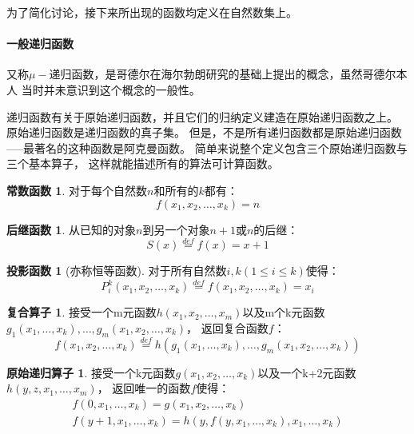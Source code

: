 \documentclass[12pt,a4paper,oneside]{ctexrep}
\theoremstyle{definition}
\newtheorem{con}[rf]{常数函数}
\newtheorem{suc}[rf]{后继函数}
\newtheorem{pro}[rf]{投影函数}
\newtheorem{com}[rf]{复合算子}
\newtheorem{pri}[rf]{原始递归算子}
\begin{document}
为了简化讨论，接下来所出现的函数均定义在自然数集上。

\paragraph{一般递归函数}

又称$\mu-$递归函数，是哥德尔在海尔勃朗研究的基础上提出的概念，虽然哥德尔本人
当时并未意识到这个概念的一般性。

递归函数有关于原始递归函数，并且它们的归纳定义建造在原始递归函数之上。
原始递归函数是递归函数的真子集。
但是，不是所有递归函数都是原始递归函数-----最著名的这种函数是阿克曼函数。
简单来说整个定义包含三个原始递归函数与三个基本算子，
这样就能描述所有的算法可计算函数。

\begin{con}
对于每个自然数$n$和所有的$k$都有：
\begin{equation}
f(x_1,x_2,\ldots,x_k)=n
\end{equation}
\end{con}

\begin{suc}
从已知的对象$n$到另一个对象$n+1$或$n$的后继：
\begin{equation}
S(x)\stackrel{def}{=}f(x)=x+1
\end{equation}
\end{suc}

\begin{pro}[亦称恒等函数]
对于所有自然数$i,k(1\leq i \leq k)$使得：
\begin{equation}
P^k_i(x_1,x_2,\ldots,x_k) \stackrel{def}{=}f(x_1,x_2,\ldots,x_k)=x_i
\end{equation}
\end{pro}

\begin{com}
接受一个m元函数$h(x_1,x_2,\ldots,x_m)$以及m个k元函数$g_1(x_1,\ldots,x_k),\ldots,g_m(x_1,x_2,\ldots,x_k)$，
返回复合函数$f$：
\begin{equation}
f(x_1,x_2,\ldots,x_k) \stackrel{def}{=}h(g_1(x_1,\ldots,x_k),\ldots,g_m(x_1,x_2,\ldots,x_k))
\end{equation}
\end{com}

\begin{pri}
接受一个k元函数$g(x_1,x_2,\ldots,x_k)$以及一个k+2元函数$h(y,z,x_1,\ldots,x_m)$，
返回唯一的函数$f$使得：
\begin{equation}
\begin{split}
f(0,x_1,\ldots,x_k) = g(x_1,x_2,\ldots,x_k)\\
f(y+1,x_1,\ldots,x_k) = h(y,f(y,x_1,\ldots,x_k),x_1,\ldots,x_k)
\end{split}
\end{equation}
\end{pri}
\end{document}
